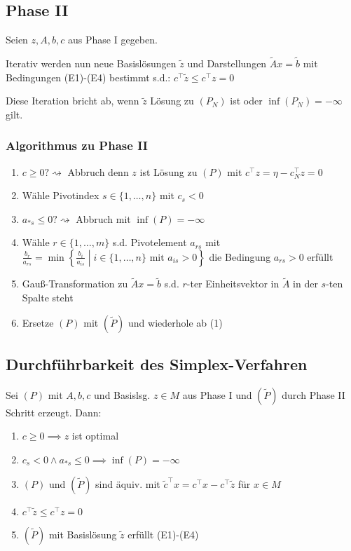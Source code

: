 \subsection*{Phase II}

Seien \(z, A, b, c\) aus Phase I gegeben.

Iterativ werden nun neue Basislösungen \(\tilde z\) und Darstellungen \(\tilde A x = \tilde b\) mit Bedingungen (E1)-(E4) bestimmt s.d.: \(c^\top \tilde z \leq c^\top z = 0\)

Diese Iteration bricht ab, wenn \(\tilde z\) Lösung zu \((P_N)\) ist oder \(\inf (P_N) = -\infty\) gilt.

\subsubsection*{Algorithmus zu Phase II}

\begin{enumerate}[label=(\arabic*)]
	\item \(c \geq 0? \rightsquigarrow\) Abbruch denn \(z\) ist Lösung zu \((P)\) mit \(c^\top z = \eta - c_N^\top z = 0\)
	\item Wähle Pivotindex \(s \in \{1,\dots,n\}\) mit \(c_s < 0\)
	\item \(a_{*s} \leq 0? \rightsquigarrow\) Abbruch mit \(\inf (P) = -\infty\)
	\item Wähle \(r \in \{1,\dots,m\}\) s.d. Pivotelement \(a_{rs}\) mit \(\frac{b_r}{a_{rs}} = \min \left\{ \frac{b_i}{a_{is}} \middle| i \in \{1,\dots,n\} \text{ mit } a_{is} > 0 \right\}\) die Bedingung \(a_{rs} > 0\) erfüllt
	\item Gauß-Transformation zu \(\tilde A x = \tilde b\) s.d. \(r\)-ter Einheitsvektor in \(\tilde A\) in der \(s\)-ten Spalte steht
	\item Ersetze \((P)\) mit \((\tilde P)\) und wiederhole ab (1)
\end{enumerate}

\subsection*{Durchführbarkeit des Simplex-Verfahren}

Sei \((P)\) mit \(A,b,c\) und Basislsg. \(z \in M\) aus Phase I und \((\tilde P)\)  durch Phase II Schritt erzeugt. Dann:

\begin{enumerate}[label=(\alph*)]
	\item \(c \geq 0 \implies z\) ist optimal
	\item \(c_s < 0 \land a_{*s} \leq 0 \implies \inf (P) = -\infty\)
	\item \((P)\) und \((\tilde P)\) sind äquiv. mit \(\tilde c^\top x = c^\top x - c^\top \tilde z\) für \(x \in M\)
	\item \(c^\top \tilde z \leq c^\top z = 0\)
	\item \((\tilde P)\) mit Basislösung \(\tilde z\) erfüllt (E1)-(E4)
\end{enumerate}

